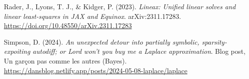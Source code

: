 \documentclass[
]{article}
\newlength{\cslhangindent}
\newenvironment{CSLReferences}[2] %
 {\begin{list}{}{%
  \setlength{\itemindent}{0pt}
  \setlength{\leftmargin}{0pt}
  \setlength{\parsep}{0pt}
  \ifodd #1
   \setlength{\leftmargin}{\cslhangindent}
   \setlength{\itemindent}{-1\cslhangindent}
  \fi
  \setlength{\itemsep}{#2\baselineskip}}}
 {\end{list}}
\begin{document}
\begin{CSLReferences}{1}{0}
Rader, J., Lyons, T. J., \& Kidger, P. (2023). \emph{Lineax: Unified
linear solves and linear least-squares in {JAX} and {Equinox}}.
arXiv:2311.17283. \url{https://doi.org/10.48550/arXiv.2311.17283}

Simpson, D. (2024). \emph{An unexpected detour into partially symbolic,
sparsity-expoiting autodiff; or {Lord} won't you buy me a {Laplace}
approximation}. Blog post, Un gar{ç}on pas comme les autres (Bayes).
\url{https://dansblog.netlify.app/posts/2024-05-08-laplace/laplace}

\end{CSLReferences}
\end{document}
